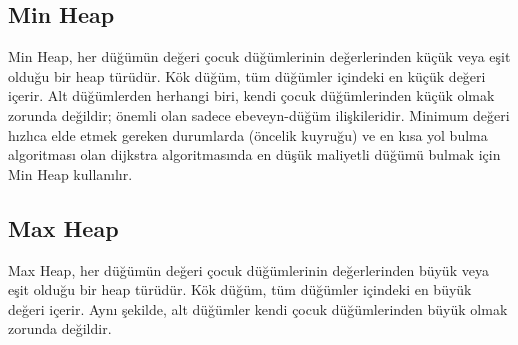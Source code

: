 \newpage

\subsection{Min Heap}

Min Heap, her düğümün değeri çocuk düğümlerinin değerlerinden küçük veya eşit olduğu bir heap türüdür. Kök düğüm, tüm düğümler içindeki en küçük değeri içerir. Alt düğümlerden herhangi biri, kendi çocuk düğümlerinden küçük olmak zorunda değildir; önemli olan sadece ebeveyn-düğüm ilişkileridir. Minimum değeri hızlıca elde etmek gereken durumlarda (öncelik kuyruğu) ve en kısa yol bulma algoritması olan dijkstra algoritmasında en düşük maliyetli düğümü bulmak için Min Heap kullanılır.

\newpage

\subsection{Max Heap}

Max Heap, her düğümün değeri çocuk düğümlerinin değerlerinden büyük veya eşit olduğu bir heap türüdür. Kök düğüm, tüm düğümler içindeki en büyük değeri içerir. Aynı şekilde, alt düğümler kendi çocuk düğümlerinden büyük olmak zorunda değildir.

\newpage